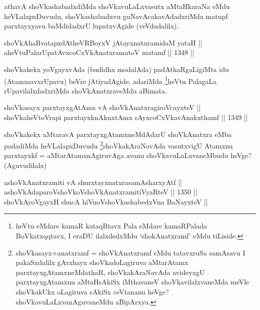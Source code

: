 \begin{artha}
athavA shoVkashabadxdiMda shoVkavuLaLxvasutx aMtaHkaraNa eMdu heVLalapxDuvudu, shoVkashabadxvu guNavAcakavAdadxriMda matupf parxtayxyavu baMdidadxrU lupatxvAgide (veVdadalilx).
\end{artha}


\begin{shl}
shoVkAhaRvatapxdAtheVRBoyxV jAtayxnatxramidaM yataH || \\
aheVtuPalarUpatAvxcoCxVkAnatxramatoV matamf \hfill || 1348 ||  
\end{shl}

\begin{artha}
shoVkakekx yoVgayxvAda (budidhx modalAda) padAthaRgaLigiMta idu (AtamxsavxrUpavu) beVre jAtiyadAgide, adariMda \footnote{heVtu eMdare kamaR kataqRtavx Pala eMdare kamaRPalada BoVkatxqqtavx, I eraDU ilalxdedxMdu `shokAnatxramf' eMdu tiLiside.}heVtu PalagaLa rUpavilalxdadxriMda shoVkAnatxraveMdu aBimata.
\end{artha}


\begin{shl}
shoVkasayx parxtayxgAtAmx vA shoVkAnatxragiroVcayxteV || \\
shoVkaheVtoVrapi parxtayxknAknxtAmx sAyxcoCxVkavAnakxthamf \hfill || 1349 ||  
\end{shl}

\begin{artha}
shoVkakekx aMtaravA parxtayxgAtamxneMdAdarU shoVkAnatxra eMba padadiMda heVLalapxDuvudu \footnote{shoVkasayx+anatxramf = shoVkAnatxramf eMdu tatavxruSa samAsavu I pakaSxdalilx gArxhayx shoVkadoLagiruva aMtarAtamx parxtayxgAtamxneMdathaR, shoVkakAraNavAda avideyxgU parxtayxgAtamxnu aMtaHsAkiSx iMthavaneV shoVkavilalxvaneMda meVle shoVkakUkx oLagiruva sAkiSx  ceVtananu heVge? shoVkavuLaLxvanAguvaneMdu aBipArxya.}shoVkakAraNavAda vasutxvigU Atamxnu parxtayxkf = aMtarAtamxnAgiruvAga avanu shoVkavuLaLxvaneMbudu heVge? (Aguvudilalx)
\end{artha}


\begin{shl}
ashoVkAnatxramiti vA shurxtayxnatxrasamAsharxyAtf ||  \\
\footnotemark[2]ashoVkAdaparoV\s shoVkoV\s shoVkAnatxramitiVyaRteV \hfill || 1350 ||  \\
shoVkAyoVgayxH shucA hiVnoV\s shoVkashabedxVna BaNayxteV || 
\end{shl}

